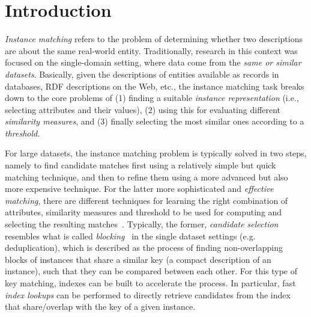 \section{Introduction}
\emph{Instance matching} \cite{DBLP:journals/ijswis/FerraraNS11} refers to the problem of determining whether two descriptions are about the same real-world entity. Traditionally, research in this context was focused on the single-domain setting, where data come from the \emph{same or similar datasets}. Basically, given the descriptions of entities available as records in databases, RDF descriptions on the Web, etc., the instance matching task breaks down to the core problems of (1) finding a suitable \emph{instance representation} (i.e., selecting attributes and their values), (2) using this for evaluating different \emph{similarity measures}, and (3) finally selecting the most similar ones according to a \emph{threshold}. 

For large datasets, the instance matching problem is typically solved in two steps, namely to find candidate matches first using a relatively simple but quick matching technique, and then to refine them using a more advanced but also more expensive technique. For the latter more sophisticated and \emph{effective matching}, there are different techniques for learning the right combination of attributes, similarity measures and threshold to be used for computing and selecting the resulting matches~\cite{DBLP:conf/cikm/SongH10,MaurouxHJAM09,nikolov08}. Typically, the former, \emph{candidate selection} resembles what is called  \emph{blocking}~\cite{hernandez_merge/purge_1995,MichelsonK06,elmagarmid_duplicate_2007} in the single dataset settings (e.g. deduplication), which is described as the process of finding non-overlapping blocks of instances that share a similar key (a compact description of an instance), such that they can be compared between each other. For this type of key matching, indexes can be built to accelerate the process. In particular, fast \emph{index lookups} can be performed to directly retrieve candidates from the index that share/overlap with the key of a given instance. 


